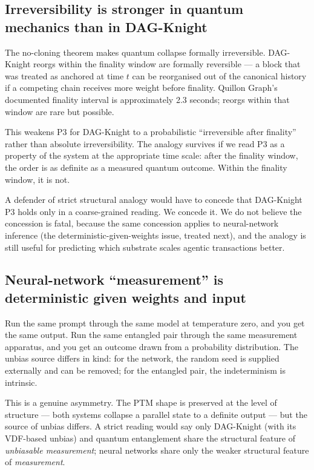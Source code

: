 \documentclass[11pt,a4paper]{article}
\begin{document}
\subsection{Irreversibility is stronger in quantum mechanics than in DAG-Knight}

The no-cloning theorem makes quantum collapse formally irreversible.
DAG-Knight reorgs within the finality window are formally reversible
--- a block that was treated as anchored at time $t$ can be reorganised
out of the canonical history if a competing chain receives more weight
before finality. Quillon Graph's documented finality interval is
approximately 2.3 seconds; reorgs within that window are rare but
possible.

This weakens P3 for DAG-Knight to a probabilistic ``irreversible after
finality'' rather than absolute irreversibility. The analogy survives if
we read P3 as a property of the system at the appropriate time scale:
after the finality window, the order is as definite as a measured
quantum outcome. Within the finality window, it is not.

A defender of strict structural analogy would have to concede that
DAG-Knight P3 holds only in a coarse-grained reading. We concede it. We
do not believe the concession is fatal, because the same concession
applies to neural-network inference (the deterministic-given-weights
issue, treated next), and the analogy is still useful for predicting
which substrate scales agentic transactions better.

\subsection{Neural-network ``measurement'' is deterministic given weights and input}

Run the same prompt through the same model at temperature zero, and you
get the same output. Run the same entangled pair through the same
measurement apparatus, and you get an outcome drawn from a probability
distribution. The unbias source differs in kind: for the network, the
random seed is supplied externally and can be removed; for the entangled
pair, the indeterminism is intrinsic.

This is a genuine asymmetry. The PTM shape is preserved at the level of
structure --- both systems collapse a parallel state to a definite output
--- but the source of unbias differs. A strict reading would say only
DAG-Knight (with its VDF-based unbias) and quantum entanglement share
the structural feature of \emph{unbiasable measurement}; neural networks
share only the weaker structural feature of \emph{measurement}.
\end{document}
